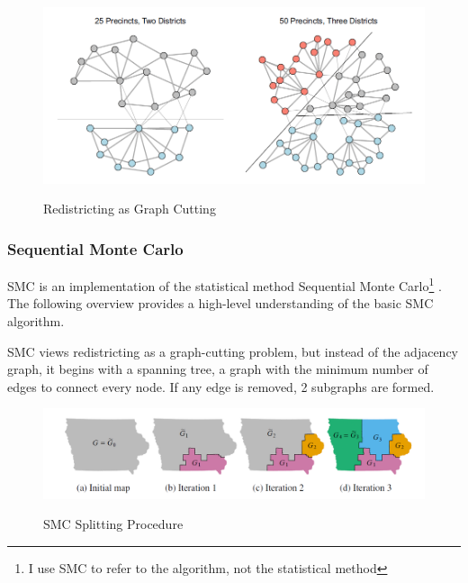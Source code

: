\begin{figure}
    \centering
    \caption{Redistricting as Graph Cutting}
    \includegraphics[width=\linewidth]{img/graphcut.png}
    \label{fig:graphcut}
    \raggedright
\end{figure} 

\subsubsection{Sequential Monte Carlo}
\label{sec:smc}

SMC is an implementation of the statistical method Sequential Monte Carlo\footnote{I use SMC to refer to the algorithm, not the statistical method} \parencite{mccartan2020}. The following overview provides a high-level understanding of the basic SMC algorithm.

SMC views redistricting as a graph-cutting problem, but instead of the adjacency graph, it begins with a spanning tree, a graph with the minimum number of edges to connect every node. If any edge is removed, 2 subgraphs are formed. 

\begin{figure}
    \centering
    \caption{SMC Splitting Procedure}
    \includegraphics[width=\linewidth]{img/smc.PNG}
    \label{fig:smc}
    \raggedright
\end{figure}

